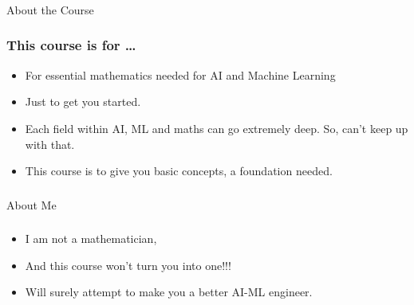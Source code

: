 \begin{frame}[fragile]\frametitle{}
\begin{center}
{\Large About the Course}
\end{center}
\end{frame}

 \begin{frame}[fragile]\frametitle{This course is for \ldots}
\begin{itemize}
\item For essential mathematics needed for AI and Machine Learning
\item Just to get you started.
\item Each field within AI, ML and maths can go extremely deep. So, can't keep up with that.
\item This course is to give you basic concepts, a foundation needed.
\end{itemize}
\end{frame}


\begin{frame}[fragile]\frametitle{}
\begin{center}
{\Large About Me}
\end{center}
\end{frame}

 \begin{frame}[fragile]\frametitle{}
\begin{itemize}
\item I am not a mathematician,
\item And this course won't turn you into one!!!
\item Will surely attempt to make you a better AI-ML engineer.
\end{itemize}
\end{frame}

